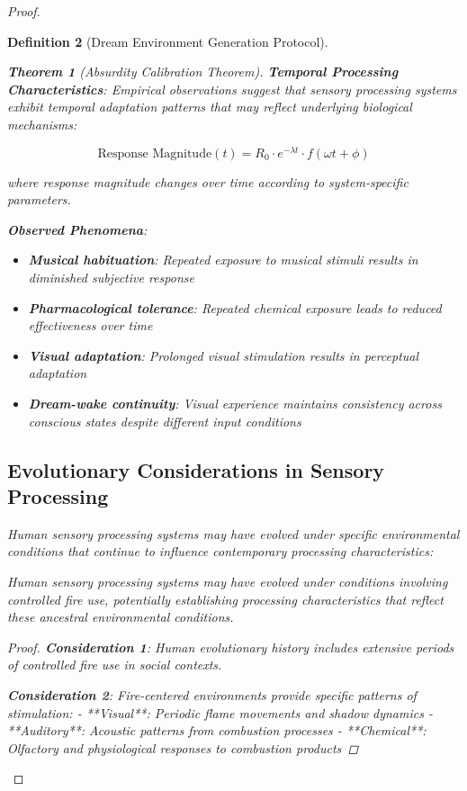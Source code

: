 \documentclass[12pt,a4paper]{article}
\newtheorem{theorem}{Theorem}[section]
\newtheorem{definition}[theorem]{Definition}
\begin{document}
\begin{proof}
\begin{definition}[Dream Environment Generation Protocol]
\begin{theorem}[Absurdity Calibration Theorem]
\textbf{Temporal Processing Characteristics}:
Empirical observations suggest that sensory processing systems exhibit temporal adaptation patterns that may reflect underlying biological mechanisms:

$$\text{Response Magnitude}(t) = R_0 \cdot e^{-\lambda t} \cdot f(\omega t + \phi)$$

where response magnitude changes over time according to system-specific parameters.

\textbf{Observed Phenomena}:
\begin{itemize}
\item \textbf{Musical habituation}: Repeated exposure to musical stimuli results in diminished subjective response
\item \textbf{Pharmacological tolerance}: Repeated chemical exposure leads to reduced effectiveness over time
\item \textbf{Visual adaptation}: Prolonged visual stimulation results in perceptual adaptation
\item \textbf{Dream-wake continuity}: Visual experience maintains consistency across conscious states despite different input conditions
\end{itemize}

\subsection{Evolutionary Considerations in Sensory Processing}

Human sensory processing systems may have evolved under specific environmental conditions that continue to influence contemporary processing characteristics:

\begin{hypothesis}
Human sensory processing systems may have evolved under conditions involving controlled fire use, potentially establishing processing characteristics that reflect these ancestral environmental conditions.
\end{hypothesis}

\begin{proof}
\textbf{Consideration 1}: Human evolutionary history includes extensive periods of controlled fire use in social contexts.

\textbf{Consideration 2}: Fire-centered environments provide specific patterns of stimulation:
- **Visual**: Periodic flame movements and shadow dynamics
- **Auditory**: Acoustic patterns from combustion processes
- **Chemical**: Olfactory and physiological responses to combustion products


\end{proof}
\end{theorem}
\end{definition}
\end{proof}
\end{document}
